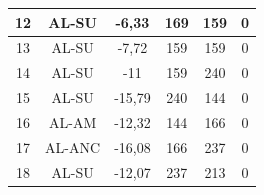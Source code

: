 \begin{table}[H]
\begin{tabular}{|c|c|c|c|c|c|}
12          & AL-SU            & -6,33                                                                    & 169                                                                      & 159                                                                       & 0                                                                              \\ \hline
13          & AL-SU            & -7,72                                                                    & 159                                                                      & 159                                                                       & 0                                                                              \\ \hline
14          & AL-SU            & -11                                                                      & 159                                                                      & 240                                                                       & 0                                                                              \\ \hline
15          & AL-SU            & -15,79                                                                   & 240                                                                      & 144                                                                       & 0                                                                              \\ \hline
16          & AL-AM            & -12,32                                                                   & 144                                                                      & 166                                                                       & 0                                                                              \\ \hline
17          & AL-ANC           & -16,08                                                                   & 166                                                                      & 237                                                                       & 0                                                                              \\ \hline
18          & AL-SU            & -12,07                                                                   & 237                                                                      & 213                                                                       & 0                                                                              \\ \hline

\end{tabular}
\end{table}

